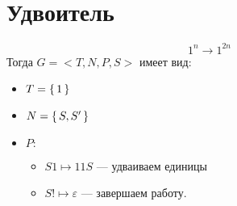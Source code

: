 \section{Удвоитель}
\[
    1^{n} \rightarrow 1^{2n}
\]
Тогда $G = <T, N, P, S>$ имеет вид:
\begin{itemize}
    \item $T = \set{1}$
    \item $N = \set{S, S'}$
    \item $P\colon$
        \begin{itemize}
            \item $S1 \mapsto 11S$ --- удваиваем единицы
            \item $S! \mapsto \varepsilon$ --- завершаем работу.
        \end{itemize}
\end{itemize}
